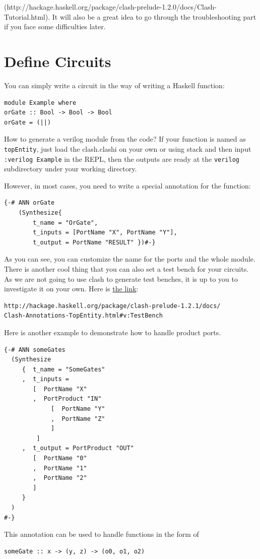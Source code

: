\documentclass[a4paper,12pt, oneside]{book}
\begin{document}
(http://hackage.haskell.org/package/clash-prelude-1.2.0/docs/Clash-Tutorial.html). It will also be a great idea to go through the troubleshooting part if you face some difficulties later.

\section{Define Circuits}
You can simply write a circuit in the way of writing a Haskell function:
\begin{verbatim}
module Example where
orGate :: Bool -> Bool -> Bool
orGate = (||)
\end{verbatim}
How to generate a verilog module from the code? If your function is named as \texttt{topEntity}, just load the clash.clashi on your own or using stack and then input \texttt{:verilog Example} in the REPL, then the outputs are ready at the \texttt{verilog} subdirectory under your working directory. 

However, in most cases, you need to write a special annotation for the function:
\begin{verbatim}
{-# ANN orGate
    (Synthesize{
        t_name = "OrGate",
        t_inputs = [PortName "X", PortName "Y"],
        t_output = PortName "RESULT" })#-}
\end{verbatim}
As you can see, you can customize the name for the ports and the whole module. There is another cool thing that you can also set a test bench for your circuits. As we are not going to use clash to generate test benches, it is up to you to investigate it on your own. Here is \href{http://hackage.haskell.org/package/clash-prelude-1.2.1/docs/Clash-Annotations-TopEntity.html#v:TestBench}{the link}:

\begin{verbatim}
http://hackage.haskell.org/package/clash-prelude-1.2.1/docs/
Clash-Annotations-TopEntity.html#v:TestBench
\end{verbatim}

Here is another example to demonstrate how to handle product ports.
\begin{verbatim}
{-# ANN someGates
  (Synthesize
     {  t_name = "SomeGates"
     ,  t_inputs = 
        [  PortName "X"
        ,  PortProduct "IN" 
             [  PortName "Y"
             ,  PortName "Z"
             ]
         ]
     ,  t_output = PortProduct "OUT" 
        [  PortName "0"
        ,  PortName "1"
        ,  PortName "2"
        ]
     }
  )
#-}
\end{verbatim}
This annotation can be used to handle functions in the form of 
\begin{verbatim}
someGate :: x -> (y, z) -> (o0, o1, o2)
\end{verbatim} 
\end{document}
